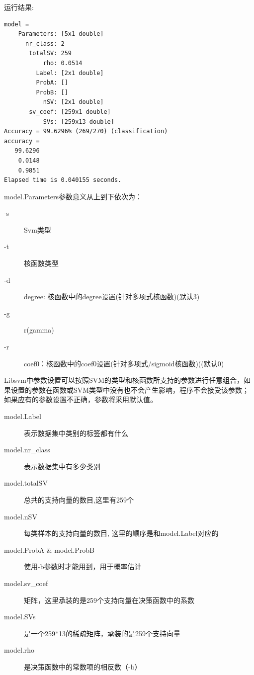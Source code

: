 \documentclass[12pt]{article}
\numberwithin{equation}{section}%
\begin{document}
运行结果:

\begin{lstlisting}
model = 
    Parameters: [5x1 double]
      nr_class: 2
       totalSV: 259
           rho: 0.0514
         Label: [2x1 double]
         ProbA: []
         ProbB: []
           nSV: [2x1 double]
       sv_coef: [259x1 double]
           SVs: [259x13 double]
Accuracy = 99.6296% (269/270) (classification)
accuracy =
   99.6296
    0.0148
    0.9851
Elapsed time is 0.040155 seconds.
\end{lstlisting}

model.Parameters参数意义从上到下依次为：

\begin{description}
\item[-s] Svm类型

\item[-t] 核函数类型

\item[-d] degree: 核函数中的degree设置(针对多项式核函数)(默认3)

\item[-g] r(gamma)

\item[-r]  coef0：核函数中的coef0设置(针对多项式/sigmoid核函数)((默认0)
\end{description}

Libsvm中参数设置可以按照SVM的类型和核函数所支持的参数进行任意组合，如果设置的参数在函数或SVM类型中没有也不会产生影响，程序不会接受该参数；如果应有的参数设置不正确，参数将采用默认值。

\begin{description}
\item[model.Label] 表示数据集中类别的标签都有什么

\item[model.nr\_class] 表示数据集中有多少类别

\item[model.totalSV] 总共的支持向量的数目,这里有259个

\item[model.nSV] 每类样本的支持向量的数目, 这里的顺序是和model.Label对应的

\item[model.ProbA  \&  model.ProbB] 使用-b参数时才能用到，用于概率估计

\item[model.sv\_coef] 矩阵，这里承装的是259个支持向量在决策函数中的系数

\item[model.SVs] 是一个259*13的稀疏矩阵，承装的是259个支持向量

\item[model.rho] 是决策函数中的常数项的相反数（-b）
\end{description}
\end{document}
